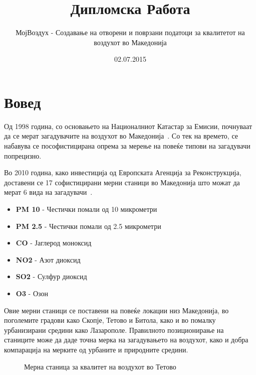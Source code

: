 \documentclass{uvamscse}
\title{Дипломска Работа}
\subtitle{МојВоздух - Создавање на отворени и поврзани податоци за квалитетот на воздухот во Македонија}
\date{02.07.2015}
\begin{document}
\maketitle
%
\chapter{Вовед}

Од 1998 година, со основањето на Националниот Катастар за Емисии, почнуваат да се мерат загадувачите на воздухот во Македонија~\cite{sajtministerstvo}. Со тек на времето, се набавува се пософистицирана опрема за мерење на повеќе типови на загадувачи попрецизно. 
\vspace{5mm}

Во 2010 година, како инвестиција од Европската Агенција за Реконструкција, доставени се 17 софистицирани мерни станици во Македонија што можат да мерат 6 вида на загадувачи~\cite{eu}.

\begin{itemize}
\item \textbf{PM 10} - Честички помали од 10 микрометри
\item \textbf{PM 2.5} - Честички помали од 2.5 микрометри
\item \textbf{CO} - Јаглерод моноксид
\item \textbf{NO2} - Азот диоксид
\item \textbf{SO2} - Сулфур диоксид
\item \textbf{O3} - Озон
\end{itemize}

Овие мерни станици се поставени на повеќе локации низ Македонија, во поголемите градови како Скопје, Тетово и Битола, како и во помалку урбанизирани средини како Лазарополе. Правилното позиционирање на станиците може да даде точна мерка на загадувањето на воздухот, како и добра компарација на мерките од урбаните и природните средини.

\begin{figure}[H]
  \caption{Мерна станица за квалитет на воздухот во Тетово}
  \label{fig:titles}
\end{figure}
\end{document}
